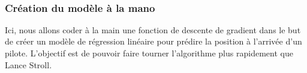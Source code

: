 \documentclass[11pt]{article}
\begin{document}
    \begin{center}
    \end{center}
    { \hspace*{\fill} \\}
    
    \hypertarget{cruxe9ation-du-moduxe8le-uxe0-la-mano}{%
\subsubsection{Création du modèle à la
mano}\label{cruxe9ation-du-moduxe8le-uxe0-la-mano}}

Ici, nous allons coder à la main une fonction de descente de gradient
dans le but de créer un modèle de régression linéaire pour prédire la
position à l'arrivée d'un pilote. L'objectif est de pouvoir faire
tourner l'algorithme plus rapidement que Lance Stroll.
\end{document}
